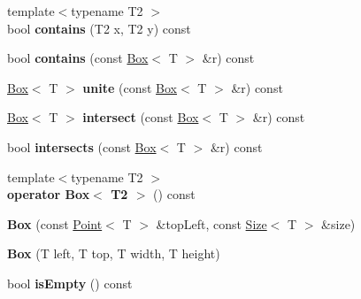 \begin{DoxyCompactItemize}
\item 
\hypertarget{class_box_ac9591ddb1c83a71913baaa7339b6b320}{
{\footnotesize template$<$typename T2 $>$ }\\bool {\bfseries contains} (T2 x, T2 y) const }
\label{class_box_ac9591ddb1c83a71913baaa7339b6b320}

\item 
\hypertarget{class_box_add30ee8481bd46e34b4f3a63a126712a}{
bool {\bfseries contains} (const \hyperlink{class_box}{Box}$<$ T $>$ \&r) const }
\label{class_box_add30ee8481bd46e34b4f3a63a126712a}

\item 
\hypertarget{class_box_aeac85e1b6d4d8387da23e02f0719ea74}{
\hyperlink{class_box}{Box}$<$ T $>$ {\bfseries unite} (const \hyperlink{class_box}{Box}$<$ T $>$ \&r) const }
\label{class_box_aeac85e1b6d4d8387da23e02f0719ea74}

\item 
\hypertarget{class_box_a7596d68ff2aeb77b8cabc436942e1388}{
\hyperlink{class_box}{Box}$<$ T $>$ {\bfseries intersect} (const \hyperlink{class_box}{Box}$<$ T $>$ \&r) const }
\label{class_box_a7596d68ff2aeb77b8cabc436942e1388}

\item 
\hypertarget{class_box_aac069f504fa8b0efde1817ec25bf72ca}{
bool {\bfseries intersects} (const \hyperlink{class_box}{Box}$<$ T $>$ \&r) const }
\label{class_box_aac069f504fa8b0efde1817ec25bf72ca}

\item 
\hypertarget{class_box_a59ff93ffee6386885d5eb5cb13610b95}{
{\footnotesize template$<$typename T2 $>$ }\\{\bfseries operator Box$<$ T2 $>$} () const }
\label{class_box_a59ff93ffee6386885d5eb5cb13610b95}

\item 
\hypertarget{class_box_ad8f5cd82926a0d9249167b4c1e4be4cc}{
{\bfseries Box} (const \hyperlink{class_point}{Point}$<$ T $>$ \&topLeft, const \hyperlink{class_size}{Size}$<$ T $>$ \&size)}
\label{class_box_ad8f5cd82926a0d9249167b4c1e4be4cc}

\item 
\hypertarget{class_box_adacfc3678389e68945da2976da8693ec}{
{\bfseries Box} (T left, T top, T width, T height)}
\label{class_box_adacfc3678389e68945da2976da8693ec}

\item 
\hypertarget{class_box_ae312de0c0f0bc30588cf928c8ea648d1}{
bool {\bfseries isEmpty} () const }
\label{class_box_ae312de0c0f0bc30588cf928c8ea648d1}


\end{DoxyCompactItemize}

